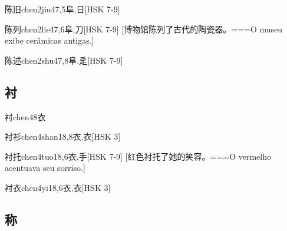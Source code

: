 \begin{EntryWithPhonetic}{陈旧}{chen2jiu4}{7,5}{⾩,⽇}[HSK 7-9]
\end{EntryWithPhonetic}

\begin{EntryWithPhonetic}{陈列}{chen2lie4}{7,6}{⾩,⼑}[HSK 7-9]
  [博物馆陈列了古代的陶瓷器。===O museu exibe cerâmicas antigas.]
\end{EntryWithPhonetic}

\begin{EntryWithPhonetic}{陈述}{chen2shu4}{7,8}{⾩,⾡}[HSK 7-9]
\end{EntryWithPhonetic}

\subsection*{衬}

\begin{EntryWithPhonetic}{衬}{chen4}{8}{⾐}
\end{EntryWithPhonetic}

\begin{EntryWithPhonetic}{衬衫}{chen4shan1}{8,8}{⾐,⾐}[HSK 3]
\end{EntryWithPhonetic}

\begin{EntryWithPhonetic}{衬托}{chen4tuo1}{8,6}{⾐,⼿}[HSK 7-9]
  [红色衬托了她的笑容。===O vermelho acentuava seu sorriso.]
\end{EntryWithPhonetic}

\begin{EntryWithPhonetic}{衬衣}{chen4yi1}{8,6}{⾐,⾐}[HSK 3]
\end{EntryWithPhonetic}

\subsection*{称}

